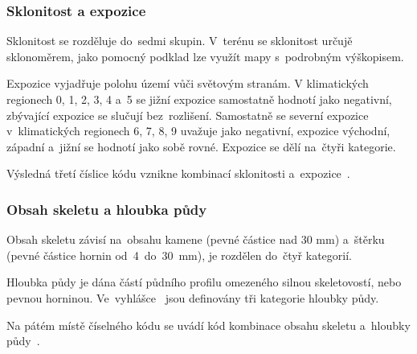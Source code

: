 \subsubsection{Sklonitost a expozice}
\label{sklonitost_expozice}

Sklonitost se rozděluje do~sedmi skupin. V~terénu se sklonitost určujě sklonoměrem, jako pomocný podklad lze využít mapy s~podrobným výškopisem.

Expozice vyjadřuje polohu území  vůči světovým stranám. V klimatických regionech 0, 1, 2, 3, 4 a~5 se jižní expozice samostatně hodnotí jako negativní, zbývající expozice se slučují bez~rozlišení. Samostatně se severní expozice v~klimatických regionech 6, 7, 8, 9 uvažuje jako negativní, expozice východní, západní a~jižní se hodnotí jako sobě rovné. Expozice se dělí na~čtyři kategorie.

Výsledná třetí číslice kódu  vznikne kombinací sklonitosti a~expozice~\citep{vyhlaska_327}.

\subsubsection{Obsah skeletu a hloubka půdy}
\label{hloubka_pudy_obsah_skeletu}

Obsah skeletu závisí na~obsahu kamene (pevné částice nad 30 mm) a~štěrku (pevné částice hornin od~4~do~30~mm), je rozdělen do~čtyř kategorií.

Hloubka půdy je dána částí půdního profilu omezeného silnou skeletovostí, nebo pevnou horninou. Ve~vyhlášce~\citep{vyhlaska_327} jsou definovány tři kategorie hloubky půdy.

Na pátém místě číselného kódu  se uvádí kód kombinace obsahu skeletu a~hloubky půdy~\citep{vyhlaska_327}.
